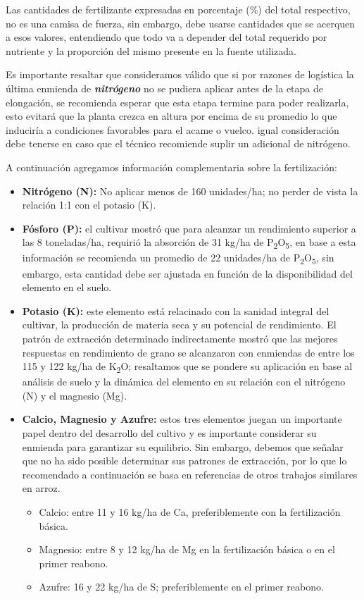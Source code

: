 \documentclass[
  letterpaper,
  DIV=11,
  numbers=noendperiod]{scrartcl}
\begin{document}
Las cantidades de fertilizante expresadas en porcentaje (\%) del total
respectivo, no es una camisa de fuerza, sin embargo, debe usarse
cantidades que se acerquen a esos valores, entendiendo que todo va a
depender del total requerido por nutriente y la proporción del mismo
presente en la fuente utilizada.

Es importante resaltar que consideramos válido que si por razones de
logística la última enmienda de \textbf{\emph{nitrógeno}} no se pudiera
aplicar antes de la etapa de elongación, se recomienda esperar que esta
etapa termine para poder realizarla, esto evitará que la planta crezca
en altura por encima de su promedio lo que induciría a condiciones
favorables para el acame o vuelco. igual consideración debe tenerse en
caso que el técnico recomiende suplir un adicional de nitrógeno.

A continuación agregamos información complementaria sobre la
fertilización:

\begin{itemize}
\item
  \textbf{Nitrógeno (N):} No aplicar menos de 160 unidades/ha; no perder
  de vista la relación 1:1 con el potasio (K).
\item
  \textbf{Fósforo (P):} el cultivar mostró que para alcanzar un
  rendimiento superior a las 8 toneladas/ha, requirió la absorción de 31
  kg/ha de P\textsubscript{2}O\textsubscript{5}, en base a esta
  información se recomienda un promedio de 22 unidades/ha de
  P\textsubscript{2}O\textsubscript{5}, sin embargo, esta cantidad debe
  ser ajustada en función de la disponibilidad del elemento en el suelo.
\item
  \textbf{Potasio (K):} este elemento está relacinado con la sanidad
  integral del cultivar, la producción de materia seca y su potencial de
  rendimiento. El patrón de extracción determinado indirectamente mostró
  que las mejores respuestas en rendimiento de grano se alcanzaron con
  enmiendas de entre los 115 y 122 kg/ha de K\textsubscript{2}O;
  resaltamos que se pondere su aplicación en base al análisis de suelo y
  la dinámica del elemento en su relación con el nitrógeno (N) y el
  magnesio (Mg).
\item
  \textbf{Calcio, Magnesio y Azufre:} estos tres elementos juegan un
  importante papel dentro del desarrollo del cultivo y es importante
  considerar su enmienda para garantizar su equilibrio. Sin embargo,
  debemos que señalar que no ha sido posible determinar sus patrones de
  extracción, por lo que lo recomendado a continuación se basa en
  referencias de otros trabajos similares en arroz.

  \begin{itemize}
  \item
    Calcio: entre 11 y 16 kg/ha de Ca, preferiblemente con la
    fertilización básica.
  \item
    Magnesio: entre 8 y 12 kg/ha de Mg en la fertilización básica o en
    el primer reabono.
  \item
    Azufre: 16 y 22 kg/ha de S; preferiblemente en el primer reabono.
  \end{itemize}
\end{itemize}
\end{document}

